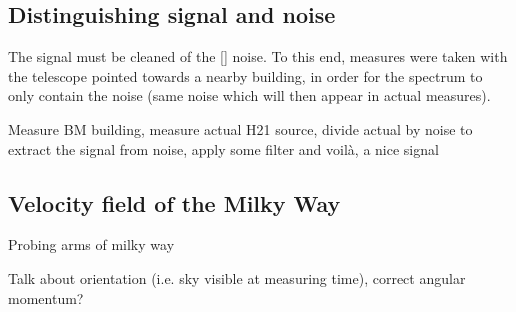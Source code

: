 \subsection{Distinguishing signal and noise}
The signal must be cleaned of the [] noise.
To this end, measures were taken with the telescope pointed towards a nearby building, in order for the spectrum to only contain the noise (same noise which will then appear in actual measures).

Measure BM building, measure actual H21 source, divide actual by noise to extract the signal from noise, apply some filter and voilà, a nice signal

\subsection{Velocity field of the Milky Way}
Probing arms of milky way

Talk about orientation (i.e. sky visible at measuring time), correct angular momentum?

